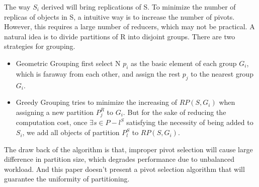 \documentclass[conference]{IEEEtran}
\begin{document}
	The way $S_i$ derived will bring replications of S. To minimize the number of replicas of objects in S, a intuitive way is to increase the number of pivots. However, this requires a large number of reducers, which may not be practical. A natural idea is to divide partitions of R into disjoint groups. There are two strategies for grouping.
	\begin{itemize}
		\item Geometric Grouping first select N $p_i$ as the basic element of each group $G_i$, which is faraway from each other, and assign the rest $p_j$ to the nearest group $G_i$.
		\item Greedy Grouping tries to minimize the increasing of $RP(S,G_i)$ when assigning a new partition $P_j^R$ to $G_i$. But for the sake of reducing the computation cost, once $\exists s \in P-l^S$ satisfying the necessity of being added to $S_i$, we add all objects of partition $P_l^S$ to $RP(S,G_i)$.  
	\end{itemize}
	
	The draw back of the algorithm is that, improper  pivot selection will cause large difference in partition size, which degrades performance due to unbalanced workload. And this paper doesn't present a pivot selection algorithm that will guarantee the uniformity of partitioning. 

	
\end{document}
